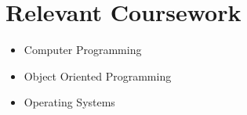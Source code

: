 \section{Relevant Coursework}
    \begin{multicols}{3}
        \begin{itemize}[itemsep=-5pt, parsep=3pt]
            \item Computer Programming 
            \item Object Oriented Programming 
            \item Operating Systems
        \end{itemize}
    \end{multicols}
    \vspace*{2.0\multicolsep}

